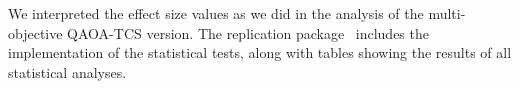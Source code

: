 We interpreted the effect size values as we did in the analysis of the multi-objective QAOA-TCS version.
The replication package~\citep{appendix} includes the implementation of the statistical tests, along with tables showing the results of all statistical analyses.

